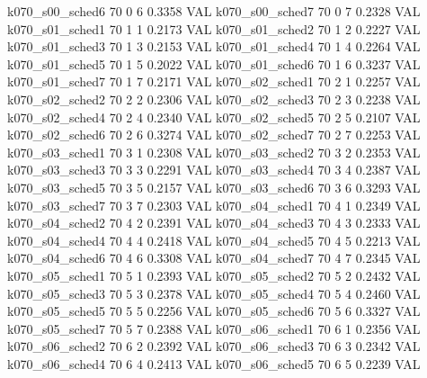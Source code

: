   k070_s00_sched6                   70    0   6    0.3358  VAL
  k070_s00_sched7                   70    0   7    0.2328  VAL
  k070_s01_sched1                   70    1   1    0.2173  VAL
  k070_s01_sched2                   70    1   2    0.2227  VAL
  k070_s01_sched3                   70    1   3    0.2153  VAL
  k070_s01_sched4                   70    1   4    0.2264  VAL
  k070_s01_sched5                   70    1   5    0.2022  VAL
  k070_s01_sched6                   70    1   6    0.3237  VAL
  k070_s01_sched7                   70    1   7    0.2171  VAL
  k070_s02_sched1                   70    2   1    0.2257  VAL
  k070_s02_sched2                   70    2   2    0.2306  VAL
  k070_s02_sched3                   70    2   3    0.2238  VAL
  k070_s02_sched4                   70    2   4    0.2340  VAL
  k070_s02_sched5                   70    2   5    0.2107  VAL
  k070_s02_sched6                   70    2   6    0.3274  VAL
  k070_s02_sched7                   70    2   7    0.2253  VAL
  k070_s03_sched1                   70    3   1    0.2308  VAL
  k070_s03_sched2                   70    3   2    0.2353  VAL
  k070_s03_sched3                   70    3   3    0.2291  VAL
  k070_s03_sched4                   70    3   4    0.2387  VAL
  k070_s03_sched5                   70    3   5    0.2157  VAL
  k070_s03_sched6                   70    3   6    0.3293  VAL
  k070_s03_sched7                   70    3   7    0.2303  VAL
  k070_s04_sched1                   70    4   1    0.2349  VAL
  k070_s04_sched2                   70    4   2    0.2391  VAL
  k070_s04_sched3                   70    4   3    0.2333  VAL
  k070_s04_sched4                   70    4   4    0.2418  VAL
  k070_s04_sched5                   70    4   5    0.2213  VAL
  k070_s04_sched6                   70    4   6    0.3308  VAL
  k070_s04_sched7                   70    4   7    0.2345  VAL
  k070_s05_sched1                   70    5   1    0.2393  VAL
  k070_s05_sched2                   70    5   2    0.2432  VAL
  k070_s05_sched3                   70    5   3    0.2378  VAL
  k070_s05_sched4                   70    5   4    0.2460  VAL
  k070_s05_sched5                   70    5   5    0.2256  VAL
  k070_s05_sched6                   70    5   6    0.3327  VAL
  k070_s05_sched7                   70    5   7    0.2388  VAL
  k070_s06_sched1                   70    6   1    0.2356  VAL
  k070_s06_sched2                   70    6   2    0.2392  VAL
  k070_s06_sched3                   70    6   3    0.2342  VAL
  k070_s06_sched4                   70    6   4    0.2413  VAL
  k070_s06_sched5                   70    6   5    0.2239  VAL

